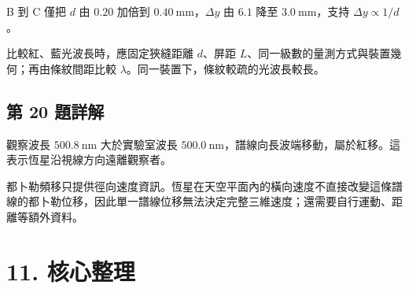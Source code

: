 \documentclass[11pt,a4paper]{article}
\begin{document}
B 到 C 僅把 \(d\) 由 \(0.20\) 加倍到 \(0.40\ \mathrm{mm}\)，\(\Delta y\) 由 \(6.1\) 降至 \(3.0\ \mathrm{mm}\)，支持 \(\Delta y\propto1/d\)。

比較紅、藍光波長時，應固定狹縫距離 \(d\)、屏距 \(L\)、同一級數的量測方式與裝置幾何；再由條紋間距比較 \(\lambda\)。同一裝置下，條紋較疏的光波長較長。

\subsection{第 20 題詳解}\label{ux7b2c-20-ux984cux8a73ux89e3}

觀察波長 \(500.8\ \mathrm{nm}\) 大於實驗室波長 \(500.0\ \mathrm{nm}\)，譜線向長波端移動，屬於紅移。這表示恆星沿視線方向遠離觀察者。

都卜勒頻移只提供徑向速度資訊。恆星在天空平面內的橫向速度不直接改變這條譜線的都卜勒位移，因此單一譜線位移無法決定完整三維速度；還需要自行運動、距離等額外資料。

\section{11. 核心整理}\label{ux6838ux5fc3ux6574ux7406}
\end{document}
